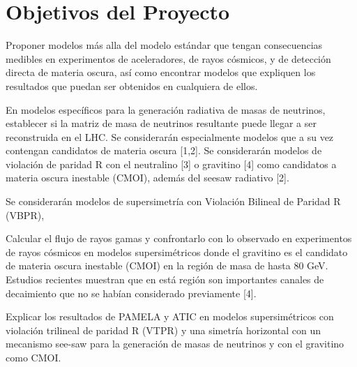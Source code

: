 \section{ Objetivos del Proyecto }

Proponer modelos más alla del modelo estándar que tengan consecuencias medibles en experimentos de aceleradores, de rayos cósmicos, y de detección directa de materia oscura, así como encontrar modelos que expliquen los resultados que puedan ser obtenidos en cualquiera de ellos.

 En modelos específicos para la generación radiativa de masas de neutrinos, establecer si la matriz de masa de neutrinos resultante puede llegar a ser reconstruida en el LHC. Se considerarán especialmente modelos que a su vez contengan candidatos de materia oscura [1,2].  Se considerarán modelos de violación de paridad R con el neutralino [3] o gravitino [4] como candidatos a materia oscura inestable (CMOI), además del seesaw radiativo [2]. 

 Se considerarán modelos de supersimetría con Violación Bilineal de Paridad R (VBPR), 



Calcular el flujo de rayos gamas y confrontarlo con lo observado en experimentos de rayos cósmicos en modelos supersimétricos donde el gravitino es el candidato de materia oscura inestable (CMOI) en la región de masa de hasta 80 GeV. Estudios recientes  muestran que en está región son importantes canales de decaimiento que no se habían considerado previamente [4]. 

Explicar los resultados de PAMELA y ATIC en modelos supersimétricos con violación trilineal de paridad R (VTPR) y una simetría horizontal con un mecanismo see-saw para la generación de masas de neutrinos y con el gravitino como CMOI.


